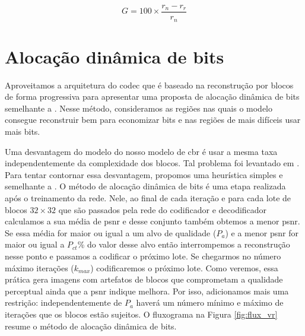 \begin{equation}
	\label{eq:gain_ce}
	G = 100 \times \frac{r_n-r_r}{r_n}
\end{equation}


\section{Alocação dinâmica de bits}\label{sec:adb}

 Aproveitamos a arquitetura do \acrshort{codec} que é baseado na reconstrução por blocos de forma progressiva para apresentar uma proposta de alocação dinâmica de bits semelhante a \cite{Priming2017Johnston}. Nesse método, consideramos as regiões nas quais o modelo consegue reconstruir bem para economizar bits e nas regiões de mais difíceis usar mais bits. 


Uma desvantagem do modelo do nosso modelo de \acrshort{cbr} é usar a mesma taxa independentemente da complexidade dos blocos. Tal problema foi levantado em \cite{Priming2017Johnston}. Para tentar contornar essa desvantagem, propomos uma heurística simples e semelhante a \cite{Priming2017Johnston}.
O método de alocação dinâmica de bits é uma etapa realizada após o treinamento da rede. Nele, ao final de cada iteração e para cada lote de blocos $32 \times 32$ que são passados pela rede do codificador e decodificador calculamos a sua média de \acrshort{psnr} e desse conjunto também obtemos a menor \acrshort{psnr}. Se essa média for maior ou igual a um alvo de qualidade ($P_{a}$) e a menor \acrshort{psnr} for maior ou igual a $P_{ct}$\% do valor desse alvo então interrompemos a reconstrução nesse ponto e passamos a codificar o próximo lote. Se chegarmos no número máximo iterações ($k_{max}$) codificaremos o próximo lote.
Como veremos, essa prática gera imagens com artefatos de blocos que comprometam a qualidade perceptual ainda que a \acrshort{psnr} indique melhora. Por isso, adicionamos mais uma restrição: independentemente de $P_{a}$ haverá um número mínimo e máximo de iterações que os blocos estão sujeitos. O fluxograma na Figura \ref{fig:flux_vr} resume o método de alocação dinâmica de bits. 


